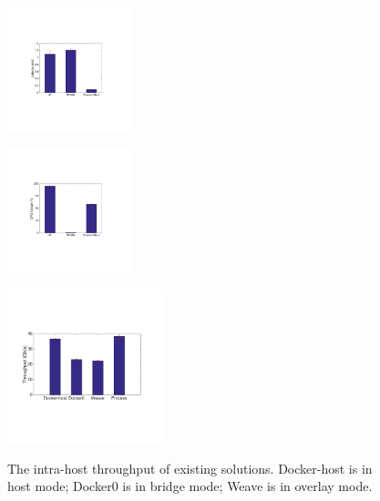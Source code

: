      \begin{figure}[ht]
     \centering 
     \includegraphics[width=0.32\textwidth]{figures/motivation/eval_baremetal_latency.pdf}      
     \label{fig:eval_baremetal_latency}
     \caption{} 
     \end{figure}

     \begin{figure}[ht]
     \centering 
     \includegraphics[width=0.32\textwidth]{figures/motivation/eval_baremetal_cpu.pdf}      
     \label{fig:eval_baremetal_cpu}
     \caption{} 
     \end{figure}

\begin{figure}[ht]
     \centering 
     \includegraphics[width=0.4\textwidth]{figures/motivation/eval_exist_bw.pdf} 
     \label{fig:eval_exist_bw}
     \caption{The intra-host throughput of existing solutions. Docker-host is in host mode; Docker0 is in bridge mode; Weave is in overlay mode.} 
\end{figure} 

